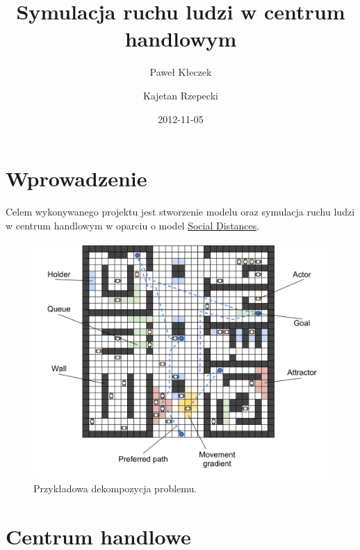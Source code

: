 \documentclass[a4paper, 12pt]{article}
\title{\textbf{Symulacja ruchu ludzi w centrum handlowym}}
\author{Paweł Kłeczek \and Kajetan Rzepecki}
\date{2012-11-05}
\begin{document}
    \vspace{\fill}
    \maketitle
    \vspace{\fill}
    \thispagestyle{empty}

\newpage
    \setcounter{page}{1}
    \setcounter{tocdepth}{3}
    \tableofcontents

\newpage
    \section{Wprowadzenie}
    \label{sec:intro}

    \noindent
    Celem wykonywanego projektu jest stworzenie modelu oraz symulacja ruchu ludzi w centrum handlowym w oparciu o model \hyperref[refs:social-distances-1]{Social Distances}.


    \begin{figure}[h!]
        \centering
        \includegraphics[scale=0.3]{./img/Overview.pdf}
        \caption{Przykładowa dekompozycja problemu.}
        \label{fig:overview}
    \end{figure}


\newpage
    \section{Centrum handlowe}
    \label{sec:mall}
\end{document}
